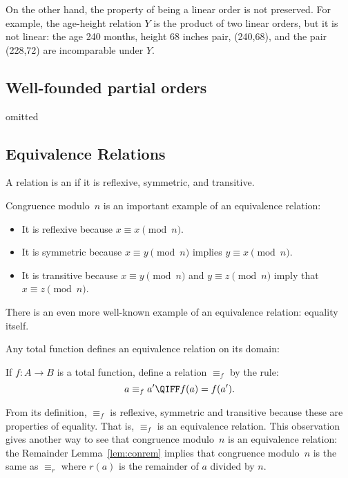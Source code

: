 On the other hand, the property of being a linear order is not preserved.
For example, the age-height relation $Y$ is the product of two linear
orders, but it is not linear: the age 240 months, height 68 inches pair,
(240,68), and the pair (228,72) are incomparable under $Y$.

\begin{problems}
\practiceproblems
{}

\classproblems
{}

\homeworkproblems
{}

\end{problems}

\begin{editingnotes}
\chapter*{Well-founded partial orders}
omitted
\end{editingnotes}

\section{Equivalence Relations}\label{equiv_rel_sec}
\begin{definition}
A relation is an  if it is reflexive,
symmetric, and transitive.
\end{definition}

Congruence modulo~$n$ is an important example of an equivalence
relation:
\begin{itemize}

\item
It is reflexive because $x \equiv x \pmod{n}$.

\item
It is symmetric because $x \equiv y \pmod{n}$ implies $y \equiv x
\pmod{n}$.

\item
It is transitive because $x \equiv y \pmod{n}$ and $y \equiv z
\pmod{n}$ imply that $x \equiv z \pmod{n}$.

\end{itemize}
There is an even more well-known example of an equivalence relation:
equality itself.

Any total function defines an equivalence relation on its domain:
\begin{definition}\label{equiv_f}
If $f:A \to B$ is a total function, define a relation $\equiv_f$ by the rule:
\[
a \equiv_f a'  \QIFF f(a) = f(a').
\]
\end{definition}
From its definition, $\equiv_f$ is reflexive, symmetric and transitive
because these are properties of equality.  That is, $\equiv_f$ is an
equivalence relation.  This observation gives another way to see that
congruence modulo~$n$ is an equivalence relation: the Remainder
Lemma~\ref{lem:conrem} implies that congruence modulo~$n$ is the same
as $\equiv_r$ where $r(a)$ is the remainder of $a$ divided by $n$.

